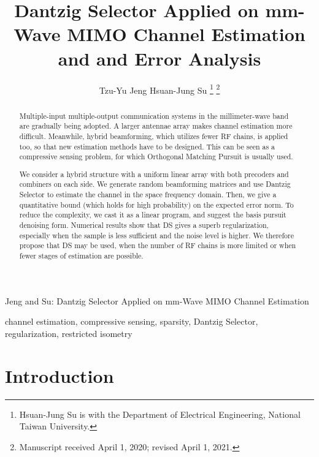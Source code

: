 \documentclass[journal]{IEEEtran}
\begin{document}
\title{Dantzig Selector Applied on mm-Wave MIMO Channel Estimation and and Error Analysis}

\author{Tzu-Yu Jeng
        Hsuan-Jung Su%
\thanks{Hsuan-Jung Su is with the Department
of Electrical Engineering, National Taiwan University.}
\thanks{Manuscript received April 1, 2020; revised April 1, 2021.}}

%
{Jeng and Su: Dantzig Selector Applied on mm-Wave MIMO Channel Estimation}

\maketitle

\begin{abstract}
Multiple-input multiple-output communication systems in the millimeter-wave band are gradually being adopted.
A larger antennae array makes channel estimation more difficult.
Meanwhile, hybrid beamforming, which utilizes fewer RF chains, is applied too, so that new estimation methods have to be designed.
This can be seen as a compressive sensing problem, for which Orthogonal Matching Pursuit is usually used.

We consider a hybrid structure with a uniform linear array with both precoders and combiners on each side.
We generate random beamforming matrices and use Dantzig Selector to estimate the channel in the space frequency domain.
Then, we give a quantitative bound (which holds for high probability) on the expected error norm.
To reduce the complexity, we cast it as a linear program, and suggest the basis pursuit denoising form.
Numerical results show that DS gives a superb regularization, especially when the sample is less sufficient and the noise level is higher.
We therefore propose that DS may be used, when the number of RF chains is more limited or when fewer stages of estimation are possible.
\end{abstract}

\begin{IEEEkeywords}
channel estimation, compressive sensing, sparsity, Dantzig Selector, regularization, restricted isometry
\end{IEEEkeywords}



\section{Introduction}
\end{document}
